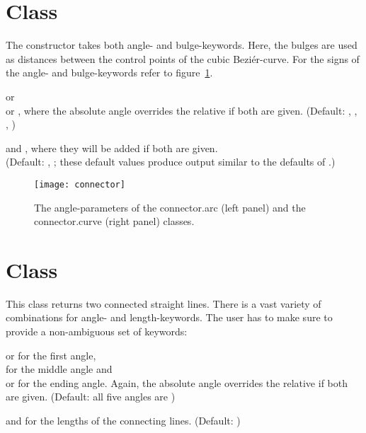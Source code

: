 \section{Class }

The constructor takes both angle- and bulge-keywords. Here, the bulges are
used as distances between the control points of the cubic Bezi\'er-curve.
For the signs of the angle- and bulge-keywords refer to figure~\ref{fig:connector}.

 or \\
 or , where the absolute angle overrides the
relative if both are given. (Default: ,
, , )\medskip

 and , where they will be added if both are
given.\\ (Default: , ; these default
values produce output similar to the defaults of .)\medskip


\begin{figure}[hbt]
\centerline{
\texttt{[image: connector]}
}
\caption{The angle-parameters of the connector.arc (left panel) and the
connector.curve (right panel) classes.}
\label{fig:connector}
\end{figure}

\section{Class }

This class returns two connected straight lines. There is a vast variety of
combinations for angle- and length-keywords. The user has to make sure to
provide a non-ambiguous set of keywords:\medskip

 or  for the first angle,\\
 for the middle angle and\\
 or  for the ending angle.
Again, the absolute angle overrides the relative if both are given. (Default:
all five angles are )\medskip

 and  for the lengths of the connecting lines.
(Default: )


